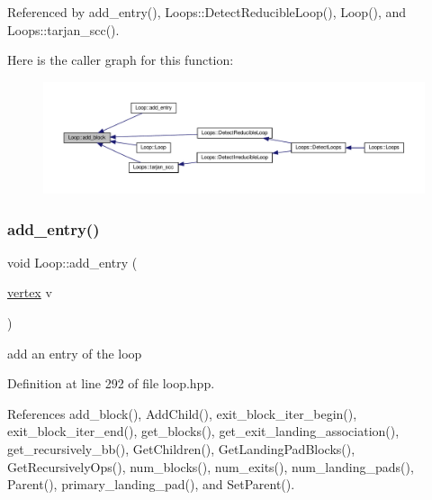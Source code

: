 Referenced by add\+\_\+entry(), Loops\+::\+Detect\+Reducible\+Loop(), Loop(), and Loops\+::tarjan\+\_\+scc().

Here is the caller graph for this function\+:
\nopagebreak
\begin{figure}[H]
\begin{center}
\leavevmode
\includegraphics[width=350pt]{de/d77/classLoop_adc20c1c81f5707afaefe4a02e2b186eb_icgraph}
\end{center}
\end{figure}
\mbox{\label{classLoop_a5f15cc1bd67e9d5fd074785d8b766328}} 
\subsubsection{\texorpdfstring{add\+\_\+entry()}{add\_entry()}}
{\footnotesize\ttfamily void Loop\+::add\+\_\+entry (\begin{DoxyParamCaption}\item[{\hyperlink{graph_8hpp_abefdcf0544e601805af44eca032cca14}{vertex}}]{v }\end{DoxyParamCaption})\hspace{0.3cm}{\ttfamily [inline]}}



add an entry of the loop 



Definition at line 292 of file loop.\+hpp.



References add\+\_\+block(), Add\+Child(), exit\+\_\+block\+\_\+iter\+\_\+begin(), exit\+\_\+block\+\_\+iter\+\_\+end(), get\+\_\+blocks(), get\+\_\+exit\+\_\+landing\+\_\+association(), get\+\_\+recursively\+\_\+bb(), Get\+Children(), Get\+Landing\+Pad\+Blocks(), Get\+Recursively\+Ops(), num\+\_\+blocks(), num\+\_\+exits(), num\+\_\+landing\+\_\+pads(), Parent(), primary\+\_\+landing\+\_\+pad(), and Set\+Parent().


